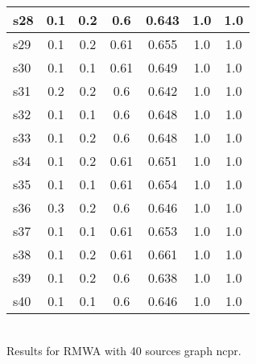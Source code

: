 \documentclass{article}
\begin{document}
\begin{tabular}{|l|c|c|c|c|c|c|}
\hline
s28 &0.1 & 0.2 & 0.6 & 0.643 & 1.0 & 1.0\\
\hline
s29 &0.1 & 0.2 & 0.61 & 0.655 & 1.0 & 1.0\\
\hline
s30 &0.1 & 0.1 & 0.61 & 0.649 & 1.0 & 1.0\\
\hline
s31 &0.2 & 0.2 & 0.6 & 0.642 & 1.0 & 1.0\\
\hline
s32 &0.1 & 0.1 & 0.6 & 0.648 & 1.0 & 1.0\\
\hline
s33 &0.1 & 0.2 & 0.6 & 0.648 & 1.0 & 1.0\\
\hline
s34 &0.1 & 0.2 & 0.61 & 0.651 & 1.0 & 1.0\\
\hline
s35 &0.1 & 0.1 & 0.61 & 0.654 & 1.0 & 1.0\\
\hline
s36 &0.3 & 0.2 & 0.6 & 0.646 & 1.0 & 1.0\\
\hline
s37 &0.1 & 0.1 & 0.61 & 0.653 & 1.0 & 1.0\\
\hline
s38 &0.1 & 0.2 & 0.61 & 0.661 & 1.0 & 1.0\\
\hline
s39 &0.1 & 0.2 & 0.6 & 0.638 & 1.0 & 1.0\\
\hline
s40 &0.1 & 0.1 & 0.6 & 0.646 & 1.0 & 1.0\\
\hline
\end{tabular}\\

\noindent Results for RMWA with 40 sources graph ncpr.
\end{document}
